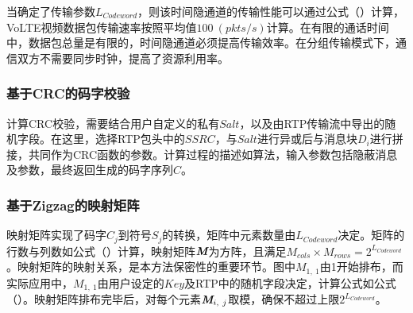 当确定了传输参数$L_{Codeword}$，则该时间隐通道的传输性能可以通过公式（）计算，VoLTE视频数据包传输速率按照平均值$100\ (pkts/s)$计算。在有限的通话时间中，数据包总量是有限的，时间隐通道必须提高传输效率。在分组传输模式下，通信双方不需要同步时钟，提高了资源利用率。

\subsubsection{基于CRC的码字校验}
\label{chap:zigzag:model:modulation:crc}

计算CRC校验，需要结合用户自定义的私有$Salt$，以及由RTP传输流中导出的随机字段。在这里，选择RTP包头中的$SSRC$，与$Salt$进行异或后与消息块$D_{i}$进行拼接，共同作为CRC函数的参数。计算过程的描述如算法，输入参数包括隐蔽消息及参数，最终返回生成的码字序列$C$。


\subsubsection{基于Zigzag的映射矩阵}
\label{chap:zigzag:model:modulation:mapping}

映射矩阵实现了码字$C_{j}$到符号$S_{j}$的转换，矩阵中元素数量由$L_{Codeword}$决定。矩阵的行数与列数如公式（）计算，映射矩阵$\textit{\textbf{M}}$为方阵，且满足$M_{cols}\times M_{rows}=2^{L_{Codeword}}$。映射矩阵的映射关系，是本方法保密性的重要环节。图中$M_{1,\ 1}$由1开始排布，而实际应用中，$M_{1,\ 1}$由用户设定的$Key$及RTP中的随机字段决定，计算公式如公式（）。映射矩阵排布完毕后，对每个元素$\textit{\textbf{M}}_{i,\ j}$取模，确保不超过上限$2^{L_{Codeword}}$。

